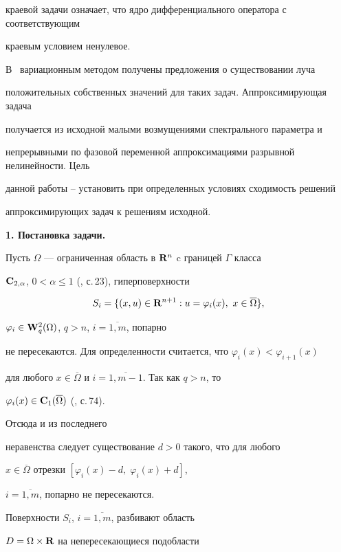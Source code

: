 краевой задачи означает, что ядро дифференциального оператора с соответствующим


краевым условием ненулевое.


В~\cite{pot1} вариационным методом получены предложения о существовании луча


положительных собственных значений для таких задач. Аппроксимирующая задача


получается из исходной малыми возмущениями спектрального параметра и


непрерывными по фазовой переменной аппроксимациями разрывной нелинейности. Цель


данной работы -- установить при определенных условиях сходимость решений


аппроксимирующих задач к решениям исходной.


\medskip








{\bf 1. Постановка задачи.}


Пусть $\Omega$ --- ограниченная область в ${\bold R}^n$ c границей $\Gamma$ класса


${\bold C}_{2,\alpha}$, $0<\alpha \leq 1$ (\cite{lad}, с.\,23), гиперповерхности


$$


S_i=\{(x, u)\in {\bold R}^{n+1} : u=\varphi_i(x),\ x\in\overline{\Omega}\},


$$


$\varphi_i\in {\bold W}_q^2(\Omega)$, $q>n$, $i=\overline{1, m}$, попарно


не пересекаются. Для определенности считается, что $\varphi_i(x)<\varphi_{i+1}(x)$


для любого $x\in\overline{\Omega}$ и $i=\overline{1, m-1}$. Так как $q>n$, то


$\varphi_i(x)\in {\bold C}_1(\overline{\Omega})$ (\cite{sob}, с.\,74). 


Отсюда и из последнего


неравенства следует существование $d>0$ такого, что для любого


$x\in\overline{\Omega}$ отрезки $[\varphi_i(x)-d,\; \varphi_i(x)+d]$,


$i=\overline{1, m}$, попарно не пересекаются.





Поверхности $S_i$, $i=\overline{1, m}$, разбивают область


$D=\Omega\times {\bold R}$ на непересекающиеся подобласти


